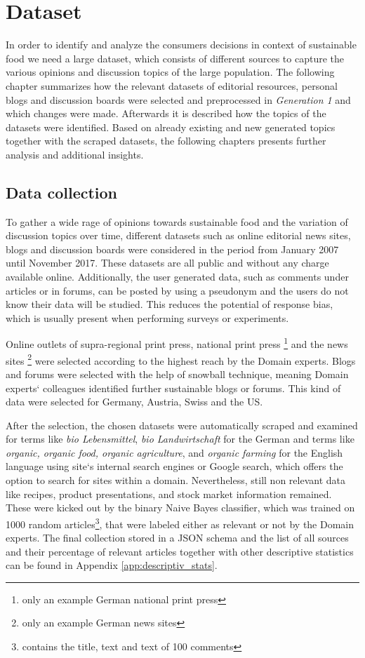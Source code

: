 \chapter{Dataset}
\label{dataset}
In order to identify and analyze the consumers decisions in context of sustainable food we need a large dataset, which consists of different sources to capture the various opinions and discussion topics of the large population.
The following chapter summarizes how the relevant datasets of editorial resources, personal blogs and discussion boards were selected and preprocessed in \textit{Generation 1} and which changes were made.
Afterwards it is described how the topics of the datasets were identified.
Based on already existing and new generated topics together with the scraped datasets, the following chapters presents further analysis and additional insights.

\section{Data collection}
To gather a wide rage of opinions towards sustainable food and the variation of discussion topics over time, different datasets such as online editorial news sites, blogs and discussion boards were considered in the period from January 2007 until November 2017. These datasets are all public and without any charge available  online. Additionally, the user generated data, such as comments under articles or in forums, can be posted by using a pseudonym and the users do not know their data will be studied. This reduces the potential of response bias, which is usually present when performing surveys or experiments.

Online outlets of supra-regional print press, national print press \citep{IVW2018}\footnote{only an example German national print press} and the news sites \citep{AGOF2018}\footnote{only an example German news sites} were selected  according to the highest reach by the Domain experts. Blogs and forums were selected with the help of snowball technique, meaning Domain experts` colleagues identified further sustainable blogs or forums. This kind of data were selected for Germany, Austria, Swiss and the US.

After the selection, the chosen datasets were automatically scraped and examined for terms like \textit{bio Lebensmittel}, \textit{ bio Landwirtschaft} for the German and terms like \textit{organic, organic food, organic agriculture}, and \textit{organic farming} for the English language using site`s internal search engines or Google search, which offers the option to search for sites within a domain. Nevertheless, still non relevant data like recipes, product presentations, and stock market information remained. These were kicked out by the binary Naive Bayes classifier, which was trained on 1000 random articles\footnote{contains the title, text and text of 100 comments}, that were labeled either as relevant or not by the Domain experts.
The final collection stored in a JSON schema and the list of all sources and their percentage of relevant articles together with other descriptive statistics can be found in Appendix \ref{app:descriptiv_stats}.

